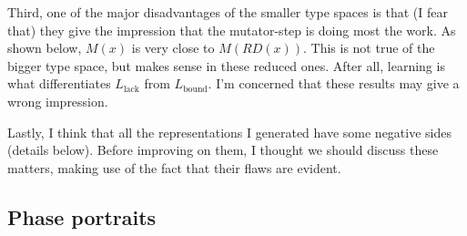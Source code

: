 \documentclass[fleqn,reqno,10pt]{article}
\newcommand{\mylang}[1]{\ensuremath{L_{\text{#1}}}\xspace} %
\newcommand{\Lbound}{\mylang{bound}}
\newcommand{\Llack}{\mylang{lack}}
\begin{document}
Third, one of the major disadvantages of the smaller type spaces is that (I fear that) they give the impression that the mutator-step is doing most the work. As shown below, $M(x)$ is very close to $M(RD(x))$. This is not true of the bigger type space, but makes sense in these reduced ones. After all, learning is what differentiates $\Llack$ from $\Lbound$. I'm concerned that these results may give a wrong impression.

Lastly, I think that all the representations I generated have some negative sides (details below). Before improving on them, I thought we should discuss these matters, making use of the fact that their flaws are evident. 

\subsection*{Phase portraits}
\end{document}
